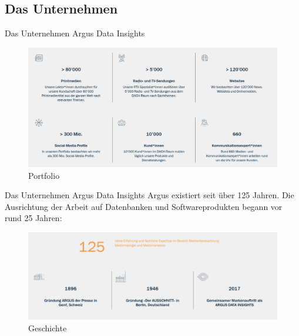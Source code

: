\documentclass[toc]{beamer}
\begin{document}
    \subsection{Das Unternehmen}
        \begin{frame}{Das Unternehmen Argus Data Insights}
            \begin{figure}[htp]
                \centering
                \includegraphics[scale=0.23]{ArgusProfil.png}
                \caption{Portfolio}
            \end{figure}
        \end{frame} 
        
        \begin{frame}{Das Unternehmen Argus Data Insights}
            Argus existiert seit über 125 Jahren. Die Ausrichtung der Arbeit auf Datenbanken und Softwareprodukten begann vor rund 25 Jahren:
            \begin{figure}[htp]
                \includegraphics[width=\textwidth]{argusGeschichte.png}
                \caption{Geschichte}
            \end{figure}
        \end{frame}   
        
\end{document}
